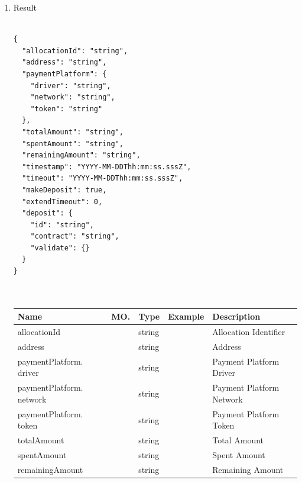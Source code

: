 \begin{enumerate}
\item Result

\begin{tcolorbox}[boxrule=0pt, frame empty]
\begin{verbatim}

{
  "allocationId": "string",
  "address": "string",
  "paymentPlatform": {
    "driver": "string",
    "network": "string",
    "token": "string"
  },
  "totalAmount": "string",
  "spentAmount": "string",
  "remainingAmount": "string",
  "timestamp": "YYYY-MM-DDThh:mm:ss.sssZ",
  "timeout": "YYYY-MM-DDThh:mm:ss.sssZ",
  "makeDeposit": true,
  "extendTimeout": 0,
  "deposit": {
    "id": "string",
    "contract": "string",
    "validate": {}
  }
}



\end{verbatim}
\end{tcolorbox}

\begin{table}[H]
\footnotesize

\begin{center}
\begin{tabular}{|p{3cm}|l|p{3cm}|p{3cm}|p{4cm}|} 
\hline
\rowcolor{lightgray}	Name	& MO.	& Type	& Example & 	Description \\
\hline

allocationId				&	&	string				&								&	Allocation Identifier \\
\hline   

address						&	&	string				&								&	Address	 \\
\hline   
  
paymentPlatform. driver		&	&	string				&								&	Payment Platform Driver \\
\hline   

paymentPlatform. network	&	&	string				&								&	Payment Platform Network \\
\hline   
  
paymentPlatform. token		&	&	string				&								&	Payment Platform Token \\
\hline
     
totalAmount					&	&	string				&								&	Total Amount \\
\hline

spentAmount					&	&	string				&								&	Spent Amount \\
\hline

remainingAmount				&	&	string				&								&	Remaining Amount \\
\hline


\end{tabular}
\end{center}
\end{table}
\end{enumerate}
